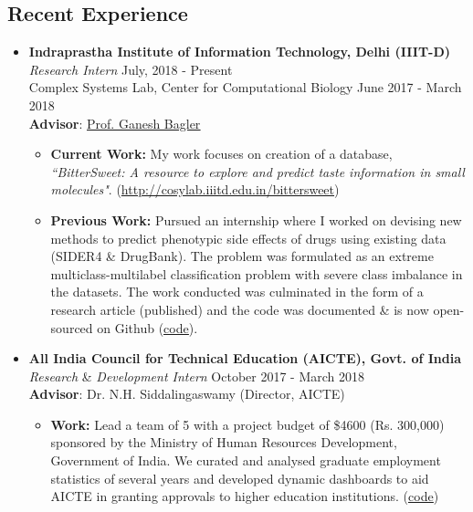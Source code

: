 \documentclass[margin,line]{res}
\begin{document}
\begin{resume}
\section{\sc Recent Experience}
\begin{itemize}[leftmargin=*]
\item {\bf Indraprastha Institute of Information Technology, Delhi (IIIT-D)}\\
\textit{Research Intern} \hfill July, 2018 - Present\\
Complex Systems Lab, Center for Computational Biology \hfill June 2017 - March 2018 \\  
{\bf Advisor}: {\href{https://scholar.google.co.in/citations?user=qyth_0QAAAAJ&hl=en}{\underline{Prof. Ganesh Bagler}}}
\begin{itemize}[leftmargin=*]
\item {\bf Current Work:} My work focuses on creation of a database, \textit{``BitterSweet: A resource to explore and predict taste information in small molecules"}. ({\href{http://cosylab.iiitd.edu.in/bittersweet/}{http://cosylab.iiitd.edu.in/bittersweet}})
\item {\bf Previous Work:} Pursued an internship where I worked on devising new methods to predict phenotypic side effects of drugs using existing data (SIDER4 \& DrugBank). The problem was formulated as an extreme multiclass-multilabel classification problem with severe class imbalance in the datasets. The work conducted was culminated in the form of a research article (published) and the code was documented \& is now open-sourced on Github ({\href{https://github.com/sominwadhwa/drugADR}{\underline{code}}}).
\end{itemize}
\item {\bf All India Council for Technical Education (AICTE), Govt. of India}\\
\textit{Research} \& \textit{Development Intern} \hfill October 2017 - March 2018\\  
{\bf Advisor}: Dr. N.H. Siddalingaswamy (Director, AICTE)
\begin{itemize}[leftmargin=*]
\item {\bf Work:} Lead a team of 5 with a project budget of \$4600 (Rs. 300,000) sponsored by the Ministry of Human Resources Development, Government of India. We curated and analysed graduate employment statistics of several years and developed dynamic dashboards to aid AICTE in granting approvals to higher education institutions. ({\href{https://github.com/TeamExtrapolate/extrapolate}{\underline{code}}})
\end{itemize}
\end{itemize}


\end{resume}
\end{document}
